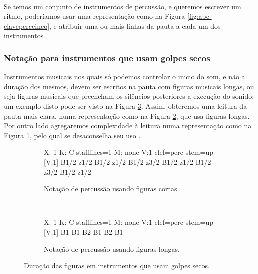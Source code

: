 \begin{example} ~

\begin{minipage}{0.845\textwidth}
Se temos um conjunto de instrumentos de percussão, 
e queremos escrever um ritmo, poderíamos usar uma representação como na Figura \ref{fig:abc-claveperccinco},
e atribuir uma ou mais linhas da pauta a cada um dos instrumentos
\end{minipage}
\end{example} 



\subsubsection{Notação para instrumentos que usam golpes secos}
Instrumentos musicais nos quais só podemos controlar o inicio do som, e não a duração dos mesmos, 
devem ser escritos na pauta com figuras musicais longas, 
ou seja figuras musicais que preencham os silêncios posteriores a execução do sonido;
um exemplo disto pode ser visto na Figura \ref{fig:clavepercusiondryall}.
Assim, obteremos uma leitura da pauta mais clara, 
numa representação como na Figura \ref{fig:abc-clavepercusiondry2}, que usa figuras longas.
Por outro lado agregaremos complexidade à leitura numa representação como na Figura \ref{fig:abc-clavepercusiondry1},
pelo qual se desaconselha seu uso \cite[pp. 289]{gould676behind}.
\begin{figure}[h]
    \centering 
\begin{subfigure}[c]{0.75\textwidth}
\begin{abc}[name=abc-clavepercusiondry1]
%
X: 1 %
K: C stafflines=1 %
M: none %
V:1 clef=perc stem=up %
%
[V:1] B1/2 z1/2 B1/2 z1/2 B1/2 z3/2 B1/2 z1/2 B1/2 z3/2 B1/2 z1/2 
\end{abc}
\caption{Notação de percussão usando figuras cortas.}
\label{fig:abc-clavepercusiondry1}
\end{subfigure}
~%
\begin{subfigure}[c]{0.70\textwidth}
\begin{abc}[name=abc-clavepercusiondry2]
%
X: 1 %
K: C stafflines=1 %
M: none %
V:1 clef=perc stem=up %
%
[V:1] B1 B1 B2 B1 B2 B1 
\end{abc}
\caption{Notação de percussão usando figuras longas.}
\label{fig:abc-clavepercusiondry2}
\end{subfigure}
    \caption{Duração das figuras em instrumentos que usam golpes secos.}\label{fig:clavepercusiondryall}
\end{figure}

